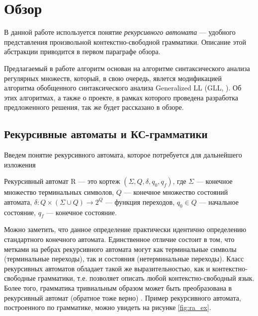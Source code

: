 \section{Обзор}

В данной работе используется понятие \textit{рекурсивного автомата} \cite{tellier2006ra} --- удобного представления произвольной контекстно-свободной грамматики.
Описание этой абстракции приводится в первом параграфе обзора.

Предлагаемый в работе алгоритм основан на алгоритме синтаксического анализа регулярных множеств, который, в свою очередь, явлется модификацией алгоритма обобщенного синтаксического анализа \linebreak Generalized LL (GLL, \cite{gll}). 
Об этих алгоритмах, а также о проекте, в рамках которого проведена разработка предложенного решения, так же будет рассказано в обзоре.

\subsection{Рекурсивные автоматы и КС-грамматики}
Введем понятие рекурсивного автомата, которое потребуется для дальнейшего изложения

\begin{defn}
	Рекурсивный автомат R --- это кортеж $(\Sigma, Q, \delta, q_0, q_f)$, где $\Sigma$ --- конечное множество терминальных символов, $Q$ --- конечное множество состояний автомата, $\delta : Q \times (\Sigma \cup Q) \rightarrow 2^Q$ --- функция переходов, $q_0 \in Q$ --- начальное состояние, $q_f$ --- конечное состояние. 
\end{defn}

Можно заметить, что данное определение практически идентично определению стандартного конечного автомата. 
Единственное отличие состоит в том, что метками на ребрах рекурсивного автомата могут как терминальные символы (терминальные переходы), так и состояния (нетерминальные переходы).
Класс рекурсивных автоматов обладает такой же выразительностью, как и контекстно-свободные грамматики, т.е. позволяет описать любой контекстно-свободный язык. 
Более того, грамматика тривиальным образом может быть преобразована в рекурсивный автомат (обратное тоже верно) \cite{tellier2006ra}. 
Пример рекурсивного автомата, построенного по грамматике, можно увидеть на рисунке \ref{fig:ra_ex}.

